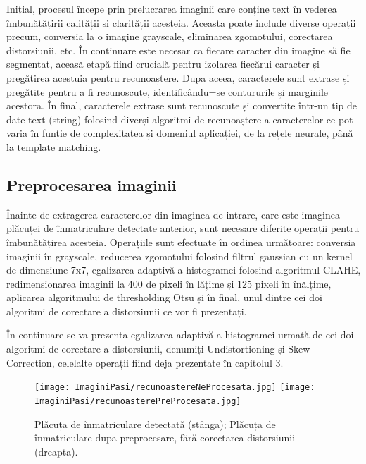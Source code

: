 \documentclass[12pt]{article}
\begin{document}
Inițial, procesul \^{i}ncepe prin prelucrarea imaginii care conține text \^{i}n vederea \^{i}mbun\u{a}t\u{a}țirii calit\u{a}ții si clarit\u{a}ții acesteia. Aceasta poate include diverse operații precum, conversia la o imagine grayscale, eliminarea zgomotului, corectarea distorsiunii, etc. \^{I}n continuare este necesar ca fiecare caracter din imagine s\u{a} fie segmentat, aceas\u{a} etap\u{a} fiind crucial\u{a} pentru izolarea fiec\u{a}rui caracter și preg\u{a}tirea acestuia pentru recunoaștere. Dupa aceea, caracterele sunt extrase și preg\u{a}tite pentru a fi recunoscute, identific\^{a}ndu=se contururile și marginile acestora. \^{I}n final, caracterele extrase sunt recunoscute și convertite \^{i}ntr-un tip de date text (string) folosind diverși algoritmi de recunoaștere a caracterelor ce pot varia \^{i}n funție de complexitatea și domeniul aplicației, de la rețele neurale, p\^{a}n\u{a} la template matching.

\subsection{Preprocesarea imaginii}

\^{I}nainte de extragerea caracterelor din imaginea de intrare, care este imaginea pl\u{a}cuței de \^{i}nmatriculare detectate anterior, sunt necesare diferite operații pentru \^{i}mbun\u{a}t\u{a}țirea acesteia. Operațiile sunt efectuate \^{i}n ordinea urm\u{a}toare: conversia imaginii \^{i}n grayscale, reducerea zgomotului folosind filtrul gaussian cu un kernel de dimensiune 7x7, egalizarea adaptiv\u{a} a histogramei folosind algoritmul CLAHE, redimensionarea imaginii la 400 de pixeli \^{i}n l\u{a}țime și 125 pixeli \^{i}n \^{i}n\u{a}lțime, aplicarea algoritmului de thresholding Otsu și \^{i}n final, unul dintre cei doi algoritmi de corectare a distorsiunii ce vor fi prezentați. 

\^{I}n continuare se va prezenta egalizarea adaptiv\u{a} a histogramei urmat\u{a} de cei doi algoritmi de corectare a distorsiunii, denumiți Undistortioning și Skew Correction, celelalte operații fiind deja prezentate \^{i}n capitolul 3.

\begin{figure}[H]
  \centering
  \texttt{[image: ImaginiPasi/recunoastereNeProcesata.jpg]}\hfill
    \texttt{[image: ImaginiPasi/recunoasterePreProcesata.jpg]}
  \caption{Pl\u{a}cuța de \^{i}nmatriculare detectat\u{a} (st\^{a}nga); Pl\u{a}cuța de \^{i}nmatriculare dupa preprocesare, f\u{a}r\u{a} corectarea distorsiunii (dreapta).}
  \label{fig:recunoastere_preprocesare}
\end{figure}
\end{document}
